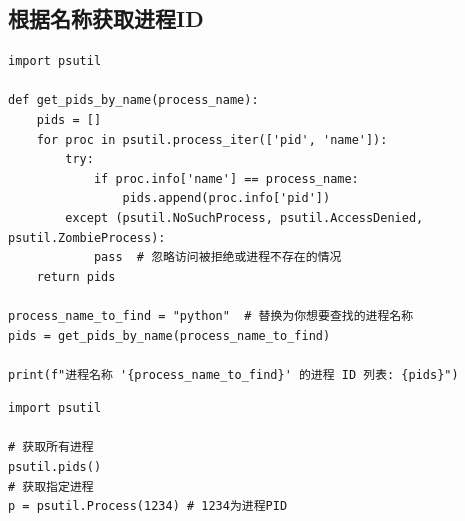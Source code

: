 \subsection{根据名称获取进程ID}
\begin{lstlisting}[style=demostyle,numbers=none]
import psutil

def get_pids_by_name(process_name):
    pids = []
    for proc in psutil.process_iter(['pid', 'name']):
        try:
            if proc.info['name'] == process_name:
                pids.append(proc.info['pid'])
        except (psutil.NoSuchProcess, psutil.AccessDenied, psutil.ZombieProcess):
            pass  # 忽略访问被拒绝或进程不存在的情况
    return pids

process_name_to_find = "python"  # 替换为你想要查找的进程名称
pids = get_pids_by_name(process_name_to_find)

print(f"进程名称 '{process_name_to_find}' 的进程 ID 列表: {pids}")
\end{lstlisting}

\begin{lstlisting}[style=demostyle,numbers=none]
import psutil

# 获取所有进程
psutil.pids()
# 获取指定进程
p = psutil.Process(1234) # 1234为进程PID
\end{lstlisting}
